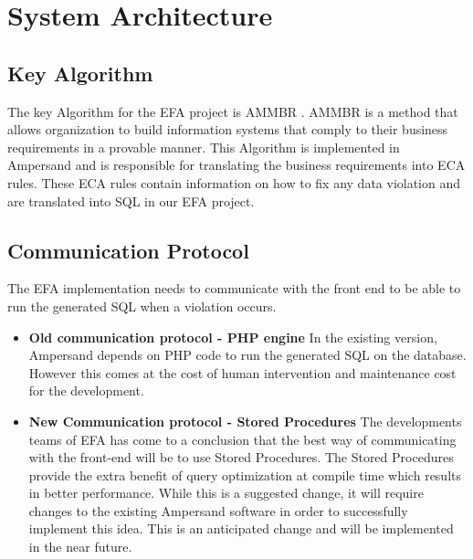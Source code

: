 \documentclass[12pt, svgnames]{article}
\begin{document}

\newpage
\section{System Architecture} \label{SystemArch}

\subsection{Key Algorithm}
The key Algorithm for the EFA project is AMMBR \cite{AMMBR}. AMMBR is a method that allows organization to build information systems that comply to their business requirements in a provable manner. This Algorithm is implemented in Ampersand and is responsible for translating the business requirements into ECA rules. These ECA rules contain information on how to fix any data violation and are translated into SQL in our EFA project.

\subsection{Communication Protocol}
The EFA implementation needs to communicate with the front end to be able to run the generated SQL when a violation occurs. 
	\begin{itemize}
		\item \textbf{Old communication protocol -  PHP engine} \newline
			In the existing version, Ampersand depends on PHP code to run the generated SQL on the database. However this comes at the cost of human intervention and maintenance cost for the development. 
		\item \textbf{New Communication protocol - Stored Procedures} \newline
			The developments teams of EFA has come to a conclusion that the best way of communicating with the front-end will be to use Stored Procedures\cite{SP}. The Stored Procedures provide the extra benefit of query optimization at compile time which results in better performance. While this is a suggested change, it will require changes to the existing Ampersand software in order to successfully implement this idea. This is an anticipated change and will be implemented in the near future.
			
	\end{itemize}
\end{document}
